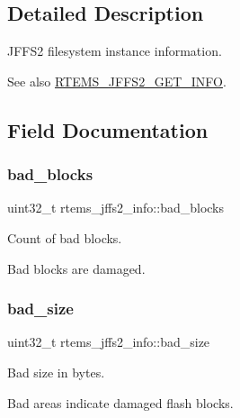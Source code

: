 \subsection{Detailed Description}
J\+F\+F\+S2 filesystem instance information. 

\begin{DoxySeeAlso}{See also}
\mbox{\hyperlink{group__JFFS2_ga9069cf243a2d497d065c41ef3c735783}{R\+T\+E\+M\+S\+\_\+\+J\+F\+F\+S2\+\_\+\+G\+E\+T\+\_\+\+I\+N\+FO}}. 
\end{DoxySeeAlso}


\subsection{Field Documentation}
\mbox{\label{structrtems__jffs2__info_a70de0d41ece7c5ea2b376c7d9ca4023d}} 
\subsubsection{\texorpdfstring{bad\_blocks}{bad\_blocks}}
{\footnotesize\ttfamily uint32\+\_\+t rtems\+\_\+jffs2\+\_\+info\+::bad\+\_\+blocks}



Count of bad blocks. 

Bad blocks are damaged. \mbox{\label{structrtems__jffs2__info_ae9e4525d1c6e9368da1df949dc582873}} 
\subsubsection{\texorpdfstring{bad\_size}{bad\_size}}
{\footnotesize\ttfamily uint32\+\_\+t rtems\+\_\+jffs2\+\_\+info\+::bad\+\_\+size}



Bad size in bytes. 

Bad areas indicate damaged flash blocks. \mbox{\label{structrtems__jffs2__info_a6b2cd9e6f208a127e1d50f5d553ccb9f}} 
